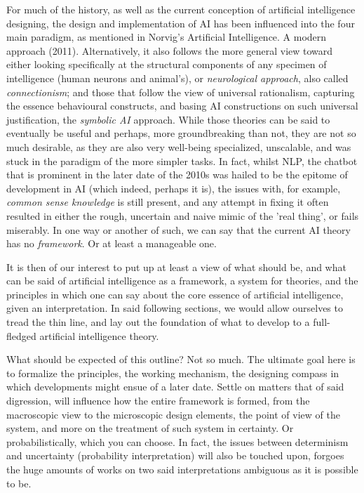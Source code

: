 For much of the history, as well as the current conception of artificial intelligence designing, the design and implementation of AI has been influenced into the four main paradigm, as mentioned in Norvig's Artificial Intelligence. A modern approach (2011). Alternatively, it also follows the more general view toward either looking specifically at the structural components of any specimen of intelligence (human neurons and animal's), or \textit{neurological approach}, also called \textit{connectionism}; and those that follow the view of universal rationalism, capturing the essence behavioural constructs, and basing AI constructions on such universal justification, the \textit{symbolic AI} approach. While those theories can be said to eventually be useful and perhaps, more groundbreaking than not, they are not so much desirable, as they are also very well-being specialized, unscalable, and was stuck in the paradigm of the more simpler tasks. In fact, whilst NLP, the chatbot that is prominent in the later date of the 2010s was hailed to be the epitome of development in AI (which indeed, perhaps it is), the issues with, for example, \textit{common sense knowledge} is still present, and any attempt in fixing it often resulted in either the rough, uncertain and naive mimic of the 'real thing', or fails miserably. In one way or another of such, we can say that the current AI theory has no \textit{framework}. Or at least a manageable one. 

It is then of our interest to put up at least a view of what should be, and what can be said of artificial intelligence as a framework, a system for theories, and the principles in which one can say about the core essence of artificial intelligence, given an interpretation. In said following sections, we would allow ourselves to tread the thin line, and lay out the foundation of what to develop to a full-fledged artificial intelligence theory. 

What should be expected of this outline? Not so much. The ultimate goal here is to formalize the principles, the working mechanism, the designing compass in which developments might ensue of a later date. Settle on matters that of said digression, will influence how the entire framework is formed, from the macroscopic view to the microscopic design elements, the point of view of the system, and more on the treatment of such system in certainty. Or probabilistically, which you can choose. In fact, the issues between determinism and uncertainty (probability interpretation) will also be touched upon, forgoes the huge amounts of works on two said interpretations ambiguous as it is possible to be. 
